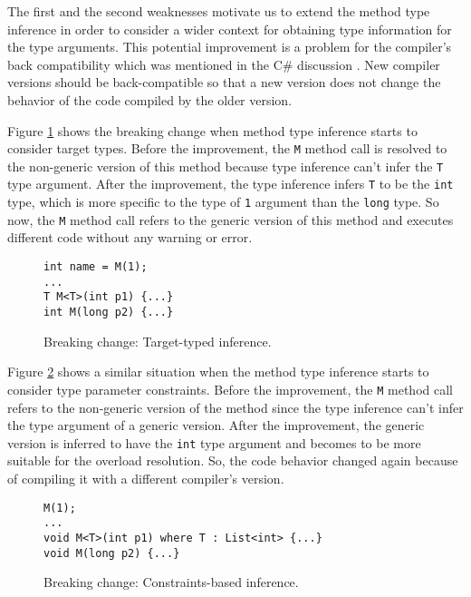 \par
{}
The first and the second weaknesses motivate us to extend the method type inference in order to consider a wider context for obtaining type information for the type arguments. 
This potential improvement is a problem for the compiler's back compatibility which was mentioned in the C\# discussion \cite{online:breakingChange}. 
New compiler versions should be back-compatible so that a new version does not change the behavior of the code compiled by the older version.
\par
{}
Figure \ref{img30:breakingChange1} shows the breaking change when method type inference starts to consider target types. 
Before the improvement, the \texttt{M} method call is resolved to the non-generic version of this method because type inference can’t infer the \texttt{T} type argument. 
After the improvement, the type inference infers \texttt{T} to be the \texttt{int} type, which is more specific to the type of \texttt{1} argument than the \texttt{long} type. 
So now, the \texttt{M} method call refers to the generic version of this method and executes different code without any warning or error.
\begin{figure}[h]
\begin{lstlisting}[style=csharp]
int name = M(1);
...
T M<T>(int p1) {...}
int M(long p2) {...}
\end{lstlisting}
\caption{Breaking change: Target-typed inference.}
\label{img30:breakingChange1}
\end{figure}
\par
{}
Figure \ref{img31:breakingChange2} shows a similar situation when the method type inference starts to consider type parameter constraints. 
Before the improvement, the \texttt{M} method call refers to the non-generic version of the method since the type inference can’t infer the type argument of a generic version. 
After the improvement, the generic version is inferred to have the \texttt{int} type argument and becomes to be more suitable for the overload resolution. 
So, the code behavior changed again because of compiling it with a different compiler's version.
\begin{figure}[h]
\begin{lstlisting}[style=csharp]
M(1);
...
void M<T>(int p1) where T : List<int> {...}
void M(long p2) {...}
\end{lstlisting}
\caption{Breaking change: Constraints-based inference.}
\label{img31:breakingChange2}
\end{figure}
